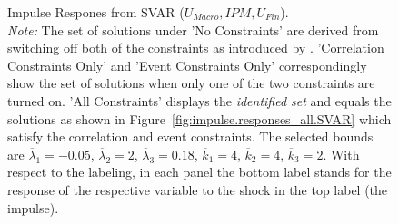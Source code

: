 \documentclass[a4paper,11pt,listof=nochaptergap,oneside,pointednumbers,bibtotoc,bigheadings,liststotoc,hidelinks]{scrbook}
\theoremstyle{mysatz}
\theoremstyle{mydefinition}
\theoremstyle{mytheorem}
\theoremstyle{mybemerkung}
\begin{document}
\begin{figure}[!h]
   \centering
   \setlength\fboxsep{0pt}
   \setlength\fboxrule{0pt}
      \caption[Impulse Respones from SVAR ($U_{Macro}, IPM, U_{Fin}$).]{Impulse Respones from SVAR ($U_{Macro}, IPM, U_{Fin}$).\\
      \textit{Note:} The set of solutions under 'No Constraints' are derived from switching off both of the constraints as introduced by \citet{ludvigsonetal:18}. 'Correlation Constraints Only' and 'Event Constraints Only' correspondingly show the set of solutions when only one of the two constraints are turned on. 'All Constraints' displays the \textit{identified set} and equals the solutions as shown in Figure~\ref{fig:impulse.responses_all.SVAR} which satisfy the correlation and event constraints. The selected bounds are $\overline{\lambda}_1 = -0.05$, $\overline{\lambda}_2 = 2$, $\overline{\lambda}_3 = 0.18$, $\overline{k}_1 = 4$, $\overline{k}_2 = 4$, $\overline{k}_3 = 2$. With respect to the labeling, in each panel the bottom label stands for the response of the respective variable to the shock in the top label (the impulse).}   \label{fig:impulse.responses_all.SVAR_UNCONSTR}
\end{figure}
\end{document}
